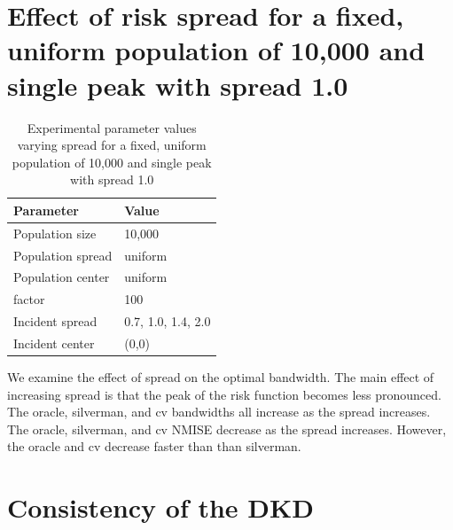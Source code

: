


\section[Effect of risk spread with fixed population]
    {Effect of risk \gls{spread} for a fixed, uniform population of 10,000 and single peak with \gls{spread} 1.0}
\label{sec:results:spread}

\begin{table}[htbp]
\centering
\begin{tabular}{ll}
\hline
Parameter & Value \\
\hline
Population size & 10,000 \\
Population \gls{spread} & uniform \\
Population center & uniform \\
\Gls{factor} & 100 \\
Incident \gls{spread} & 0.7, 1.0, 1.4, 2.0 \\
Incident center & (0,0) \\
\hline
\end{tabular}
\caption[Effect of spread with fixed population]
    {Experimental parameter values varying \gls{spread} for a fixed, uniform population of 10,000 and single peak with \gls{spread} 1.0}
\label{tab:params:results:spread}
\end{table}

We examine the effect of spread on the optimal bandwidth.
The main effect of increasing spread is that the peak of the risk function becomes less pronounced.
The \gls{oracle}, \gls{silverman}, and \gls{cv} bandwidths all increase as the spread increases.
The \gls{oracle}, \gls{silverman}, and \gls{cv} NMISE decrease as the spread increases.
However, the \gls{oracle} and \gls{cv} decrease faster than than \gls{silverman}.



\section{Consistency of the DKD}
\label{sec:results:consistency}

